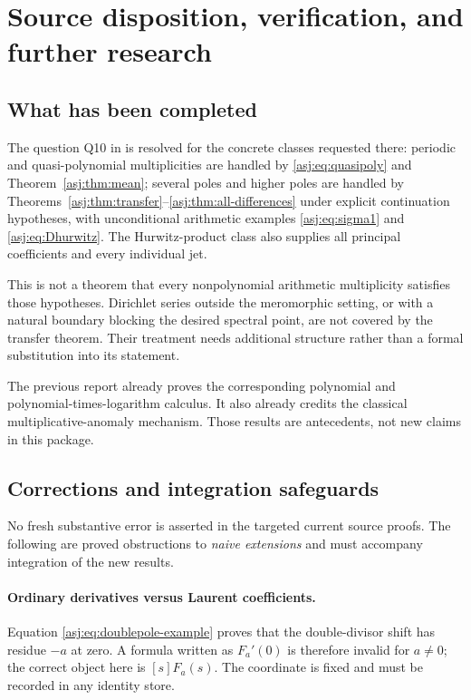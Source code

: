 \section{Source disposition, verification, and further research}
\label{asj:sec:audit}

\subsection{What has been completed}
The question Q10 in \cite{prior} is resolved for the concrete classes
requested there: periodic and quasi-polynomial multiplicities are
handled by \eqref{asj:eq:quasipoly} and Theorem~\ref{asj:thm:mean}; several
poles and higher poles are handled by Theorems~\ref{asj:thm:transfer}--\ref{asj:thm:all-differences}
under explicit continuation hypotheses, with unconditional arithmetic
examples \eqref{asj:eq:sigma1} and \eqref{asj:eq:Dhurwitz}. The Hurwitz-product
class also supplies all principal coefficients and every individual jet.

This is not a theorem that every nonpolynomial arithmetic multiplicity
satisfies those hypotheses. Dirichlet series outside the meromorphic
setting, or with a natural boundary blocking the desired spectral point,
are not covered by the transfer theorem. Their treatment needs additional
structure rather than a formal substitution into its statement.

The previous report already proves the corresponding polynomial and
polynomial-times-logarithm calculus. It also already credits the classical
multiplicative-anomaly mechanism. Those results are antecedents, not new
claims in this package.

\subsection{Corrections and integration safeguards}
No fresh substantive error is asserted in the targeted current source
proofs. The following are proved obstructions to \emph{naive extensions}
and must accompany integration of the new results.

\paragraph{Ordinary derivatives versus Laurent coefficients.}
Equation \eqref{asj:eq:doublepole-example} proves that the double-divisor
shift has residue $-a$ at zero. A formula written as $F_a'(0)$ is
therefore invalid for $a\ne0$; the correct object here is $[s]F_a(s)$.
The coordinate is fixed and must be recorded in any identity store.

